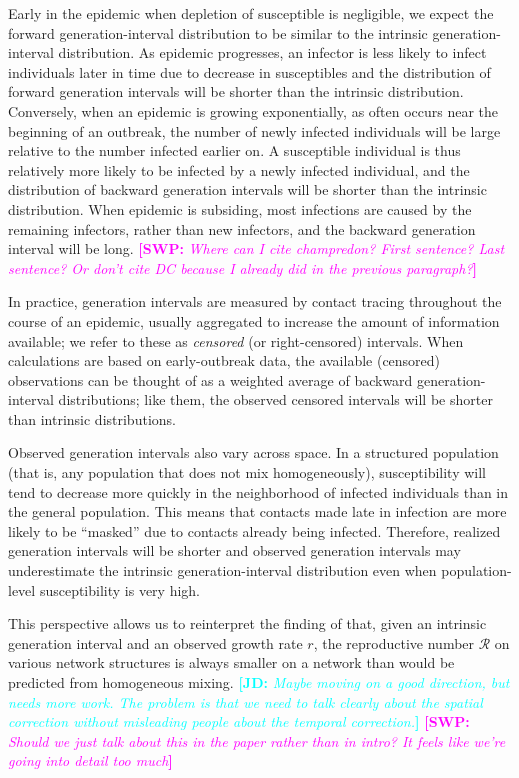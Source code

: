 \documentclass[12pt]{article}
\newcommand{\RR}{\ensuremath{{\mathcal R}}}
\newcommand{\comment}[3]{\textcolor{#1}{\textbf{[#2: }\textsl{#3}\textbf{]}}}
\newcommand{\jd}[1]{\comment{cyan}{JD}{#1}}
\newcommand{\swp}[1]{\comment{magenta}{SWP}{#1}}
\begin{document}
Early in the epidemic when depletion of susceptible is negligible, we expect the forward generation-interval distribution to be similar to the intrinsic generation-interval distribution.
As epidemic progresses, an infector is less likely to infect individuals later in time due to decrease in susceptibles and the distribution of forward generation intervals will be shorter than the intrinsic distribution.
Conversely, when an epidemic is growing exponentially, as often occurs near the beginning of an outbreak, the number of newly infected individuals will be large relative to the number infected earlier on. 
A susceptible individual is thus relatively more likely to be infected by a newly infected individual, and the distribution of backward generation intervals will be shorter than the intrinsic distribution.
When epidemic is subsiding, most infections are caused by the remaining infectors, rather than new infectors, and the backward generation interval will be long.
\swp{Where can I cite champredon? First sentence? Last sentence? Or don't cite DC because I already did in the previous paragraph?}

In practice, generation intervals are measured by contact tracing throughout the course of an epidemic, usually aggregated to increase the amount of information available; we refer to these as \emph{censored} (or right-censored) intervals.
When calculations are based on early-outbreak data, the available (censored) observations can be thought of as a weighted average of backward generation-interval distributions; like them, the observed censored intervals will be shorter than intrinsic distributions.

Observed generation intervals also vary across space.
In a structured population (that is, any population that does not mix homogeneously), susceptibility will tend to decrease more quickly in  the neighborhood of infected individuals than in the general population. 
This means that contacts made late in infection are more likely to be ``masked'' due to contacts already being infected.
Therefore, realized generation intervals will be shorter and observed generation intervals may underestimate the intrinsic generation-interval distribution even when population-level susceptibility is very high.

This perspective allows us to reinterpret the finding of \cite{trapman2016inferring} that, given an intrinsic generation interval and an observed growth rate $r$, the reproductive number $\RR$ on various network structures is always smaller on a network than would be predicted from homogeneous mixing.
\jd{Maybe moving on a good direction, but needs more work. The problem is that we need to talk clearly about the spatial correction without misleading people about the temporal correction.}
\swp{Should we just talk about this in the paper rather than in intro? It feels like we're going into detail too much}
\end{document}
